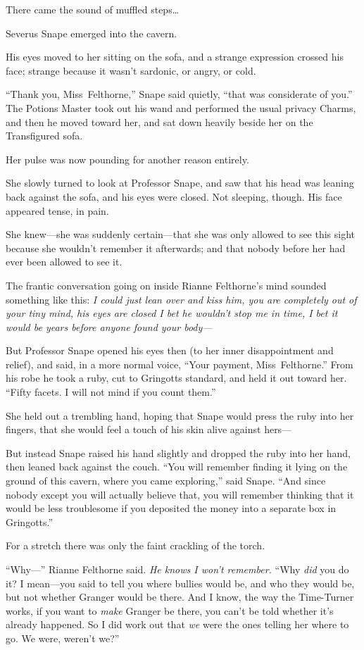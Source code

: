 There came the sound of muffled steps…

Severus Snape emerged into the cavern.

His eyes moved to her sitting on the sofa, and a strange expression crossed his face; strange because it wasn’t sardonic, or angry, or cold.

“Thank you, Miss~Felthorne,” Snape said quietly, “that was considerate of you.” The Potions Master took out his wand and performed the usual privacy Charms, and then he moved toward her, and sat down heavily beside her on the Transfigured sofa.

Her pulse was now pounding for another reason entirely.

She slowly turned to look at Professor Snape, and saw that his head was leaning back against the sofa, and his eyes were closed. Not sleeping, though. His face appeared tense, in pain.

She knew—she was suddenly certain—that she was only allowed to see this sight because she wouldn’t remember it afterwards; and that nobody before her had ever been allowed to see it.

The frantic conversation going on inside Rianne Felthorne’s mind sounded something like this: \emph{I could just lean over and kiss him, you are completely out of your tiny mind, his eyes are closed I bet he wouldn’t stop me in time, I bet it would be years before anyone found your body—}

But Professor Snape opened his eyes then (to her inner disappointment and relief), and said, in a more normal voice, “Your payment, Miss~Felthorne.” From his robe he took a ruby, cut to Gringotts standard, and held it out toward her. “Fifty facets. I will not mind if you count them.”

She held out a trembling hand, hoping that Snape would press the ruby into her fingers, that she would feel a touch of his skin alive against hers—

But instead Snape raised his hand slightly and dropped the ruby into her hand, then leaned back against the couch. “You will remember finding it lying on the ground of this cavern, where you came exploring,” said Snape. “And since nobody except you will actually believe that, you will remember thinking that it would be less troublesome if you deposited the money into a separate box in Gringotts.”

For a stretch there was only the faint crackling of the torch.

“Why—” Rianne Felthorne said. \emph{He knows I won’t remember.} “Why \emph{did} you do it? I mean—you said to tell you where bullies would be, and who they would be, but not whether Granger would be there. And I know, the way the Time-Turner works, if you want to \emph{make} Granger be there, you can’t be told whether it’s already happened. So I did work out that \emph{we} were the ones telling her where to go. We were, weren’t we?”

